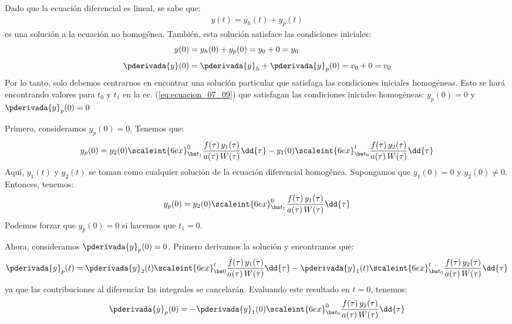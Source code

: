 Dado que la ecuación diferencial es lineal, se sabe que:
\begin{align*}
y (t) = y_{h} (t) + y_{p} (t)
\end{align*}
es una solución a la ecuación no homogénea. También, esta solución satisface las condiciones iniciales:
\begin{align*}
y (0) &= y_{h} (0) + y_{p} (0) = y_{0} + 0 = y_{0} \\[0.5em]
\pderivada{y} (0) &= \pderivada{y}_{h} + \pderivada{y}_{p} (0) = v_{0} + 0 = v_{0}
\end{align*}
Por lo tanto, solo debemos centrarnos en encontrar una solución particular que satisfaga las condiciones iniciales homogéneas. Esto se hará encontrando valores para $t_{0}$ y $t_{1}$ en la ec. (\ref{eq:ecuacion_07_09}) que satisfagan las condiciones iniciales homogéneas: $y_{p} (0) = 0$ y $\pderivada{y}_{p} (0) = 0$
\par
Primero, consideramos $y_{p} (0) = 0$. Tenemos que:
\begin{align}
y_{p} (0) = y_{2} (0) \scaleint{6ex}_{\bs t_{1}}^{0} \dfrac{f (\tau) \, y_{1} (\tau)}{a (\tau) \, W (\tau)} \dd{\tau} - y_{1} (0) \scaleint{6ex}_{\bs t_{0}}^{t} \dfrac{f (\tau) \, y_{2} (\tau)}{a (\tau) \, W (\tau)} \dd{\tau}
\label{eq:ecuacion_07_15}
\end{align}
Aquí, $y_{1} (t)$ y $y_{2} (t)$ se toman como cualquier solución de la ecuación diferencial homogénea. Supongamos que $y_{1} (0) = 0$ y $y_{2} (0) \neq 0$. Entonces, tenemos:
\begin{align}
y_{p} (0) = y_{2} (0) \scaleint{6ex}_{\bs t_{1}}^{0} \dfrac{f (\tau) \, y_{1} (\tau)}{a (\tau) \, W (\tau)} \dd{\tau}
\label{eq:ecuacion_07_16}
\end{align}
Podemos forzar que $y_{p} (0) = 0$ si hacemos que $t_{1} = 0$.
\par
Ahora, consideramos $\pderivada{y}_{p} (0) = 0$. Primero derivamos la solución y encontramos que:
\begin{align}
\pderivada{y}_{p} (t) = \pderivada{y}_{2} (t) \scaleint{6ex}_{\bs 0}^{t} \dfrac{f (\tau) \, y_{1} (\tau)}{a (\tau) \, W (\tau)} \dd{\tau} - \pderivada{y}_{1} (t) \scaleint{6ex}_{\bs t_{0}}^{t} \dfrac{f (\tau) \, y_{2} (\tau)}{a (\tau) \, W (\tau)} \dd{\tau}
\label{eq:ecuacion_07_17}
\end{align}
ya que las contribuciones al diferenciar las integrales se cancelarán. Evaluando este resultado en $t = 0$, tenemos:
\begin{align}
\pderivada{y}_{p} (0) = - \pderivada{y}_{1} (0) \scaleint{6ex}_{\bs t_{0}}^{0} \dfrac{f (\tau) \, y_{2} (\tau)}{a (\tau) \, W (\tau)} \dd{\tau}
\label{eq:ecuacion_07_18}
\end{align}
